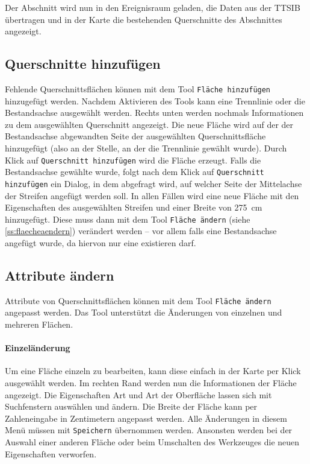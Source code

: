 \documentclass[a4paper,11pt,bibliography=totoc, listof=totoc,titlepage]{scrartcl}
\begin{document}
Der Abschnitt wird nun in den Ereignisraum geladen, die Daten aus der TTSIB übertragen und in der Karte die bestehenden \Gls{Querschnitt}e des Abschnittes angezeigt.

\subsection{Querschnitte hinzufügen}
Fehlende \Gls{Querschnitt}sflächen können mit dem Tool \verb|Fläche hinzufügen| hinzugefügt werden. Nachdem Aktivieren des Tools kann eine Trennlinie oder die Bestandsachse ausgewählt werden. Rechts unten werden nochmals Informationen zu dem ausgewählten \Gls{Querschnitt} angezeigt. Die neue Fläche wird auf der der Bestandsachse abgewandten Seite der ausgewählten \Gls{Querschnitt}sfläche hinzugefügt (also an der Stelle, an der die Trennlinie gewählt wurde). Durch Klick auf \verb|Querschnitt hinzufügen| wird die Fläche erzeugt. Falls die Bestandsachse gewählte wurde, folgt nach dem Klick auf \verb|Querschnitt hinzufügen| ein Dialog, in dem abgefragt wird, auf welcher Seite der Mittelachse der Streifen angefügt werden soll. In allen Fällen wird eine neue Fläche mit den Eigenschaften des ausgewählten Streifen und einer Breite von 275~cm hinzugefügt. Diese muss dann mit dem Tool \verb|Fläche ändern| (siehe \autoref{ss:flaecheaendern}) verändert werden -- vor allem falls eine Bestandsachse angefügt wurde, da hiervon nur eine existieren darf.

\subsection{Attribute ändern}
\label{ss:flaecheaendern}
Attribute von \Gls{Querschnitt}sflächen können mit dem Tool \verb|Fläche ändern| angepasst werden. Das Tool unterstützt die Änderungen von einzelnen und mehreren Flächen.

\paragraph{Einzeländerung}
\label{p:flächeeinzeln}
Um eine Fläche einzeln zu bearbeiten, kann diese einfach in der Karte per Klick ausgewählt werden. Im rechten Rand werden nun die Informationen der Fläche angezeigt. Die Eigenschaften Art und Art der Oberfläche lassen sich mit \Gls{Suchfenster}n auswählen und ändern. Die Breite der Fläche kann per Zahleneingabe in Zentimetern angepasst werden. Alle Änderungen in diesem Menü müssen mit \verb|Speichern| übernommen werden. Ansonsten werden bei der Auswahl einer anderen Fläche oder beim Umschalten des Werkzeuges die neuen Eigenschaften verworfen.
\end{document}
